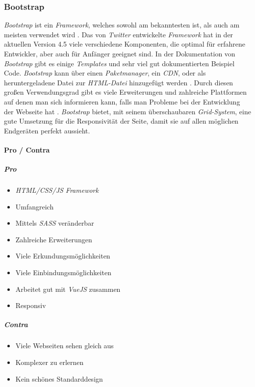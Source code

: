 		\subsubsection{Bootstrap}
		\label{chapter:study-frontend-frameworks-bootstrap}
		\textit{Bootstrap} ist ein \textit{Framework}, welches sowohl am bekanntesten ist, als auch am meisten verwendet wird \cite{introduction-bootstrap, learning-bootstrap}. Das von \textit{Twitter} entwickelte \textit{Framework} hat in der aktuellen Version 4.5 viele verschiedene Komponenten, die optimal für erfahrene Entwickler, aber auch für Anfänger geeignet sind. In der Dokumentation von \textit{Bootstrap} gibt es einige \textit{Templates} und sehr viel gut dokumentierten Beispiel Code\cite{introduction-bootstrap}. \textit{Bootstrap} kann über einen \textit{Paketmanager}, ein \textit{CDN}, oder als heruntergeladene Datei zur \textit{HTML-Datei} hinzugefügt werden \cite{bootstrap-docu}. Durch diesen großen Verwendungsgrad gibt es viele Erweiterungen und zahlreiche Plattformen auf denen man sich informieren kann, falls man Probleme bei der Entwicklung der Webseite hat \cite{learning-bootstrap}. \textit{Bootstrap} bietet, mit seinem überschaubaren \textit{Grid-System}, eine gute Umsetzung für die Responsivität der Seite, damit sie auf allen möglichen Endgeräten perfekt aussieht.
		\paragraph{Pro / Contra}
		\subparagraph{Pro}
		\begin{itemize}
			\item \textit{HTML/CSS/JS Framework}
			\item Umfangreich
			\item Mittels \textit{SASS} veränderbar
			\item Zahlreiche Erweiterungen
			\item Viele Erkundungsmöglichkeiten
			\item Viele Einbindungsmöglichkeiten
			\item Arbeitet gut mit \textit{VueJS} zusammen
			\item Responsiv
		\end{itemize}
	\label{list:bootstrappro}
		\subparagraph{Contra}
		\begin{itemize}
			\item Viele Webseiten sehen gleich aus
			\item Komplexer zu erlernen
			\item Kein schönes Standarddesign
		\end{itemize}
	\label{list:bootstrapcontra}
	
